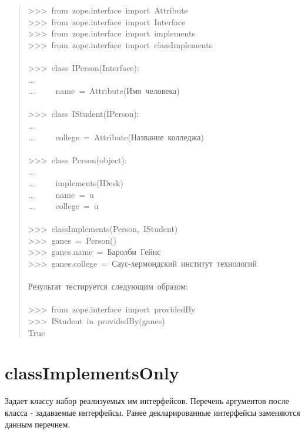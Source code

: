 \documentclass[a4paper,openany,twoside,final]{book}
\begin{document}
\begin{quote}{\ttfamily \raggedright \noindent
>{}>{}>~from~zope.interface~import~Attribute\\
>{}>{}>~from~zope.interface~import~Interface\\
>{}>{}>~from~zope.interface~import~implements\\
>{}>{}>~from~zope.interface~import~classImplements\\
~\\
>{}>{}>~class~IPerson(Interface):\\
...\\
...~~~~~name~=~Attribute(\textquotedbl{}Имя~человека\textquotedbl{})\\
~\\
>{}>{}>~class~IStudent(IPerson):\\
...\\
...~~~~~college~=~Attribute(\textquotedbl{}Название~колледжа\textquotedbl{})\\
~\\
>{}>{}>~class~Person(object):\\
...\\
...~~~~~implements(IDesk)\\
...~~~~~name~=~u\textquotedbl{}\textquotedbl{}\\
...~~~~~college~=~u\textquotedbl{}\textquotedbl{}\\
~\\
>{}>{}>~classImplements(Person,~IStudent)\\
>{}>{}>~ganes~=~Person()\\
>{}>{}>~ganes.name~=~\textquotedbl{}Баролби~Гейнс\textquotedbl{}\\
>{}>{}>~ganes.college~=~\textquotedbl{}Саус-хермондский~институт~технологий\textquotedbl{}\\
~\\
Результат~тестируется~следующим~образом:\\
~\\
>{}>{}>~from~zope.interface~import~providedBy\\
>{}>{}>~IStudent~in~providedBy(ganes)\\
True
}
\end{quote}


\section*{classImplementsOnly%
  \label{classimplementsonly}%
}

Задает классу набор реализуемых им интерфейсов.  Перечень аргументов
после класса - задаваемые интерфейсы.  Ранее декларированные
интерфейсы заменяются данным перечнем.
\end{document}
